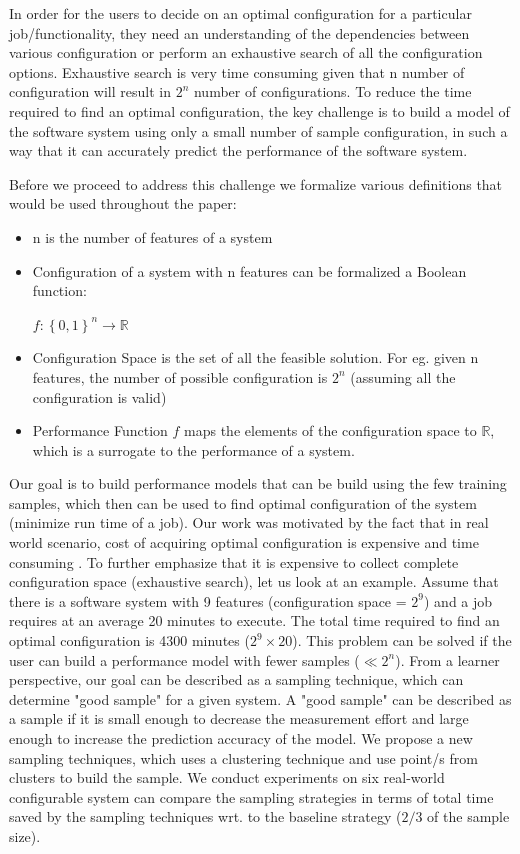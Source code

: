 \documentclass{sig-alternative}
\newcommand{\bi}{\begin{itemize}[leftmargin=0.4cm]}
\newcommand{\ei}{\end{itemize}}
\begin{document}
 In order for the users to decide on an optimal configuration for a particular job/functionality, they need an understanding of the dependencies between various configuration or perform an exhaustive search of all the configuration options. Exhaustive search is very time consuming given that n number of configuration will result in $2^n$ number of configurations. To reduce the time required to find an optimal configuration, the key challenge is to build a model of the software system using only a small number of sample configuration, in such a way that it can accurately predict the performance of the software system.
 
 Before we proceed to address this challenge we formalize various definitions that would be used throughout the paper:
 \bi
    \item{n is the number of features of a system}
    \item{Configuration of a system with n features can be formalized a Boolean function:\\
\begin{center}
    $ f: \left\{{0,1}\right\}^n \to \mathbb{R}$
\end{center}
    }
    
    \item{Configuration Space is the set of all the feasible solution. For eg. given n features, the number of possible configuration is $2^n$ (assuming all the configuration is valid) }
    \item{Performance Function $f$ maps the elements of the configuration space to $\mathbb{R}$, which is a surrogate to the performance of a system.   }
 \ei
 
Our goal is to build performance models that can be build using the few training samples, which then can be used to find optimal configuration of the system (minimize run time of a job). Our work was motivated by the fact that in real world scenario, cost of acquiring optimal configuration is expensive and time consuming \cite{weiss2008maximizing}. To further emphasize that it is expensive to collect complete configuration space (exhaustive search), let us look at an example. Assume that there is a software system with 9 features (configuration space = $2^9$) and a job requires at an average 20 minutes to execute. The total time required to find an optimal configuration is 4300 minutes ($2^9 \times 20$). This problem can be solved if the user can build a performance model with fewer samples ($\ll 2^n$). From a learner perspective, our goal can be described as a sampling technique, which can determine "good sample" for a given system. A "good sample" can be described as a sample if it is small enough to decrease the measurement effort and large enough to increase the prediction accuracy of the model. We propose a new sampling techniques, which uses a clustering technique and use point/s from clusters to build the sample. We conduct experiments on six real-world configurable system can compare the sampling strategies in terms of total time saved by the sampling techniques wrt. to the baseline strategy ($2/3$ of the sample size).
\end{document}
